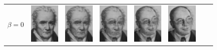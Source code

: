\renewcommand{\sidecap}[1]{ {\begin{sideways}\parbox{1.9cm}{\centering #1}\end{sideways}} }
\begin{figure}[!ht]
\begin{center}
\begin{tabular}{cccccccc}
\sidecap{$\beta=0$ } &\hspace{-0.45cm}
\includegraphics[width=1.9cm]{images/MK/MK_beta0_01}&
\hspace{-0.35cm}\includegraphics[width=1.9cm]{images/MK/MK_beta0_11}&
\hspace{-0.35cm}\includegraphics[width=1.9cm]{images/MK/MK_beta0_21}&
\hspace{-0.35cm}\includegraphics[width=1.9cm]{images/MK/MK_beta0_31}&
\hspace{-0.35cm}\includegraphics[width=1.9cm]{images/MK/MK_beta0_41}&

\end{tabular}
\end{center}
\end{figure}
